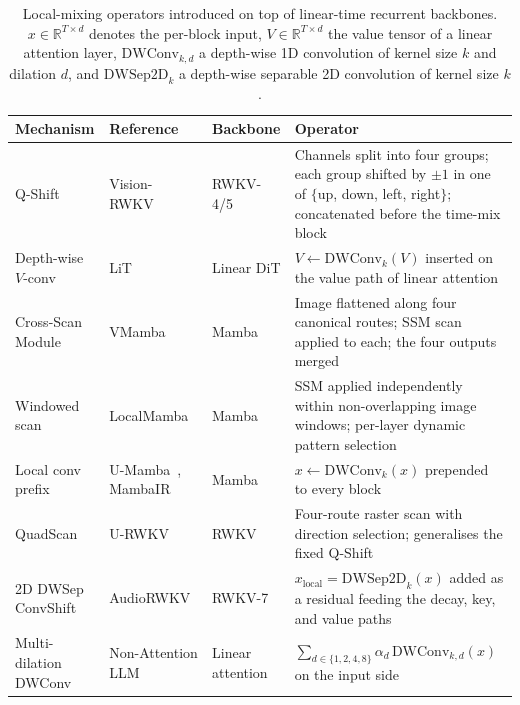 \begin{table}[t]
\centering
\small
\caption[Cross-modality local-mixing operators]{Local-mixing
operators introduced on top of linear-time recurrent backbones.
$x \in \mathbb{R}^{T \times d}$ denotes the per-block input,
$V \in \mathbb{R}^{T \times d}$ the value tensor of a linear
attention layer, $\mathrm{DWConv}_{k, d}$ a depth-wise 1D
convolution of kernel size $k$ and dilation $d$, and
$\mathrm{DWSep2D}_{k}$ a depth-wise separable 2D convolution
of kernel size $k$.}
\label{tab:local-mixing-cross-domain}
\setlength{\tabcolsep}{4pt}
\renewcommand{\arraystretch}{1.08}
\begin{tabularx}{\linewidth}{@{}p{2.25cm} p{2.45cm} p{1.45cm} X@{}}
\toprule
\textbf{Mechanism} & \textbf{Reference} & \textbf{Backbone} & \textbf{Operator} \\
\midrule
Q-Shift &
Vision-RWKV~\cite{duan2024visionrwkv} &
RWKV-4/5 &
Channels split into four groups; each group shifted by $\pm 1$ in
one of $\{$up, down, left, right$\}$; concatenated before the
time-mix block \\
\addlinespace
Depth-wise $V$-conv &
LiT~\cite{wang2025lit} &
Linear DiT &
$V \leftarrow \mathrm{DWConv}_{k}(V)$ inserted on the value path
of linear attention \\
\addlinespace
Cross-Scan Module &
VMamba~\cite{liu2024vmamba} &
Mamba &
Image flattened along four canonical routes; SSM scan applied to
each; the four outputs merged \\
\addlinespace
Windowed scan &
LocalMamba~\cite{huang2024localmamba} &
Mamba &
SSM applied independently within non-overlapping image windows;
per-layer dynamic pattern selection \\
\addlinespace
Local conv prefix &
U-Mamba~\cite{ma2024umamba}, MambaIR~\cite{guo2024mambair} &
Mamba &
$x \leftarrow \mathrm{DWConv}_{k}(x)$ prepended to every block \\
\addlinespace
QuadScan &
U-RWKV~\cite{ye2025urwkv} &
RWKV &
Four-route raster scan with direction selection; generalises the
fixed Q-Shift \\
\addlinespace
2D DWSep ConvShift &
AudioRWKV~\cite{xiong2025audiorwkv} &
RWKV-7 &
$x_{\mathrm{local}} = \mathrm{DWSep2D}_{k}(x)$ added as a
residual feeding the decay, key, and value paths \\
\addlinespace
Multi-dilation DWConv &
Non-Attention LLM~\cite{kiruluta2025breaking} &
Linear attention &
$\sum_{d \in \{1, 2, 4, 8\}} \alpha_{d} \,
\mathrm{DWConv}_{k, d}(x)$ on the input side \\
\bottomrule
\end{tabularx}
\end{table}

